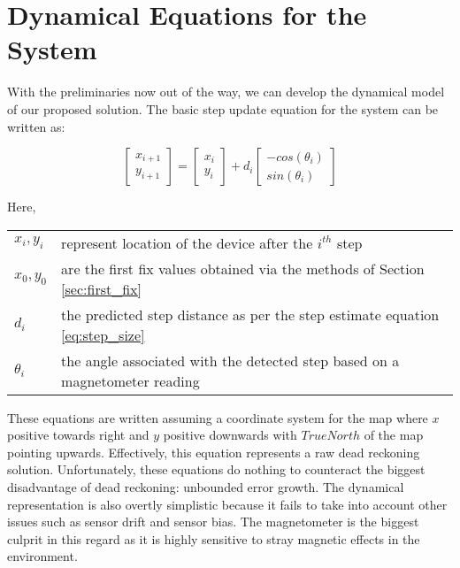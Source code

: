 \section{Dynamical Equations for the System}

With the preliminaries now out of the way, we can develop the dynamical model
of our proposed solution. The basic step update equation for the system 
can be written as:

\begin{equation}\label{eq:dr_eq}
\begin{bmatrix}x_{i+1}\\
y_{i+1}
\end{bmatrix} = \begin{bmatrix}x_{i}\\
y_{i}
\end{bmatrix}  + d{}_{i} \begin{bmatrix}-cos(\theta_{i})\\
sin(\theta_{i})
\end{bmatrix} 
\end{equation}

Here,\\
\begin{tabular}{p{1in} p{4in}}
$x_i, y_i$          &   represent location of the device after the $i^{th}$ step\\
$x_0, y_0$          &   are the first fix values obtained via the methods of Section \ref{sec:first_fix}\\
$d_i$               &   the predicted step distance as per the step estimate equation \eqref{eq:step_size}\\
$\theta_i$          &   the angle associated with the detected step based on a magnetometer reading\\
\end{tabular}

These equations are written assuming a coordinate system for the map where $x$
positive towards right and $y$ positive downwards with $TrueNorth$ of the map
pointing upwards. Effectively, this equation represents a raw dead reckoning
solution. Unfortunately, these equations do nothing to counteract the biggest
disadvantage of dead reckoning: unbounded error growth. The dynamical
representation is also overtly simplistic because it fails to take into account
other issues such as sensor drift and sensor bias. The magnetometer is the
biggest culprit in this regard as it is highly sensitive to stray magnetic
effects in the environment.

